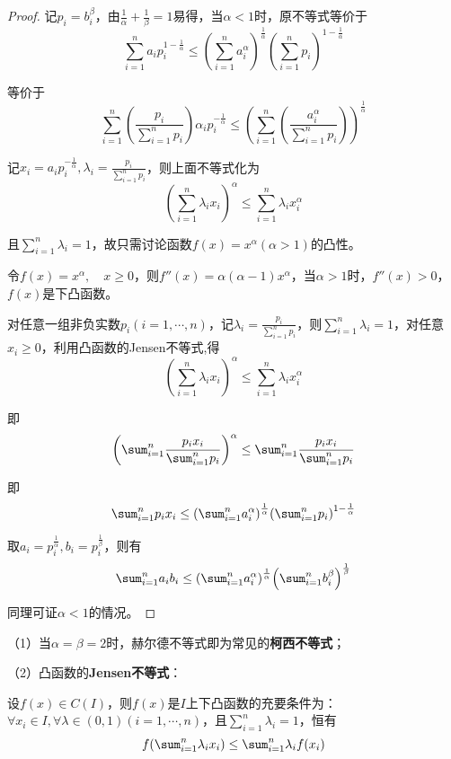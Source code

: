 \begin{proof}
	记$p_i=b_i^\beta$，由$\frac{1}{\alpha}+\frac{1}{\beta}=1$易得，当$\alpha<1$时，原不等式等价于
	\[\sum^n_{i=1}a_i p_i^{1-\frac{1}{\alpha}}\leq (\sum^n_{i=1}a^\alpha_i)^{\frac{1}{\alpha}}(\sum^n_{i=1}p_i)^{1-\frac{1}{\alpha}}\]

	等价于
	\[\sum^n_{i=1}(\frac{p_i}{\sum^n_{i=1}p_i})\alpha_i p_i^{-\frac{1}{\alpha}}\leq (\sum^n_{i=1}(\frac{a_i^\alpha}{\sum^n_{i=1}p_i}))^{\frac{1}{\alpha}}\]

	记$x_i=a_i p_i^{-\frac{1}{\alpha}},\lambda_i=\frac{p_i}{\sum^n_{i=1}p_i}$，则上面不等式化为
	\[(\sum^n_{i=1}\lambda_i x_i)^\alpha\leq \sum^n_{i=1}\lambda_i x_i^\alpha\]

	且$\sum^n_{i=1}\lambda_i=1$，故只需讨论函数$f(x)=x^\alpha(\alpha>1)$的凸性。

	令$f(x)=x^\alpha,\quad x\geq 0$，则$f''(x)=\alpha(\alpha-1)x^\alpha$，当$\alpha>1$时，$f''(x)>0$，$f(x)$是下凸函数。

	对任意一组非负实数$p_i(i=1,\cdots,n)$，记$\lambda_i=\frac{p_i}{\sum^n_{i=1}p_i}$，则$\sum^n_{i=1}\lambda_i=1$，对任意$x_i\geq 0$，利用凸函数的Jensen不等式,得
	\[(\sum^n_{i=1}\lambda_i x_i)^\alpha\leq \sum^n_{i=1}\lambda_i x_i^\alpha\]
	
	即
	\[\qty(\sum^n_{i=1}\frac{p_i x_i}{\sum^n_{i=1}p_i})^\alpha\leq \sum^n_{i=1}\frac{p_i x_i}{\sum^n_{i=1}p_i}\]
	
	即
	\[\sum^n_{i=1}p_i x_i\leq \qty(\sum^n_{i=1}a^\alpha_i)^{\frac{1}{\alpha}}\qty(\sum^n_{i=1}p_i)^{1-\frac{1}{\alpha}}\]

	取$a_i=p_i^{\frac{1}{\alpha}},b_i=p_i^{\frac{1}{\beta}}$，则有
	\[\sum^n_{i=1}a_i b_i\leq \qty(\sum^n_{i=1}a^\alpha_i)^{\frac{1}{\alpha}}\qty(\sum^n_{i=1}b^\beta_i)^{\frac{1}{\beta}}\]
	
	同理可证$\alpha<1$的情况。
\end{proof}

\begin{remark}
	（1）当$\alpha=\beta=2$时，赫尔德不等式即为常见的\textbf{柯西不等式}；

	（2）凸函数的\textbf{Jensen不等式}：

	设$f(x)\in C(I)$，则$f(x)$是$I$上下凸函数的充要条件为：$\forall x_i\in I,\forall \lambda\in(0,1)(i=1,\cdots,n)$，且$\sum^n_{i=1}\lambda_i=1$，恒有
	\[f\qty(\sum^n_{i=1}\lambda_i x_i)\leq \sum^n_{i=1}\lambda_i f(x_i)\]
\end{remark}
